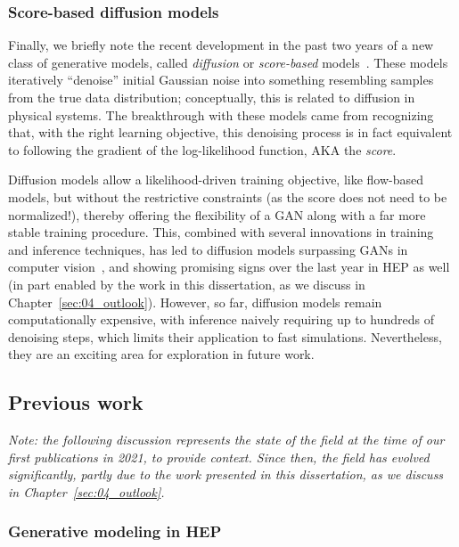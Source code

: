 \subsubsection{Score-based diffusion models}

Finally, we briefly note the recent development in the past two years of a new class of generative models, called \textit{diffusion} or \textit{score-based} models~\cite{ho2020denoising, song2021score}.
These models iteratively ``denoise'' initial Gaussian noise into something resembling samples from the true data distribution; conceptually, this is related to diffusion in physical systems.
The breakthrough with these models came from recognizing that, with the right learning objective, this denoising process is in fact equivalent to following the gradient of the log-likelihood function, AKA the \textit{score}.

Diffusion models allow a likelihood-driven training objective, like flow-based models, but without the restrictive constraints (as the score does not need to be normalized!), thereby offering the flexibility of a GAN along with a far more stable training procedure.
This, combined with several innovations in training and inference techniques, has led to diffusion models surpassing GANs in computer vision~\cite{dhariwal2021diffusion}, and showing promising signs over the last year in HEP as well (in part enabled by the work in this dissertation, as we discuss in Chapter~\ref{sec:04_outlook}).
However, so far, diffusion models remain computationally expensive, with inference naively requiring up to hundreds of denoising steps, which limits their application to fast simulations.
Nevertheless, they are an exciting area for exploration in future work.

\subsection{Previous work}
\label{sec:04_mpgan_genhep}

\textit{Note: the following discussion represents the state of the field at the time of our first publications in 2021, to provide context.
Since then, the field has evolved significantly, partly due to the work presented in this dissertation, as we discuss in Chapter~\ref{sec:04_outlook}.
}

\subsubsection{Generative modeling in HEP}

